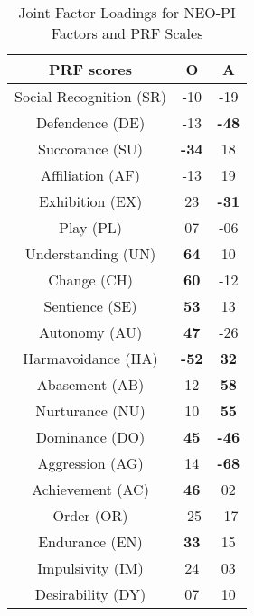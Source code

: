 \begin{table} [h]
\caption{Joint Factor Loadings for NEO-PI Factors and PRF Scales}
\centering
\begin{tabular}{c c c} 
\\
 \hline \hline
PRF	scores				& \textbf{O} 	&\textbf{A}	\\ [0.5ex] 
 \hline
 Social Recognition (SR)		& -10 		& -19		\\ 
 Defendence (DE)			& -13		& \textbf{-48}	\\
 Succorance (SU)			& \textbf{-34}	& 18			\\
 Affiliation (AF)				& -13  		& 19			\\
 Exhibition (EX)				& 23			& \textbf{-31}	\\
 Play (PL)					& 07			& -06		\\
 Understanding (UN)			& \textbf{64}	& 10			\\
 Change (CH)				& \textbf{60}	& -12		\\
 Sentience (SE)				& \textbf{53}	& 13			\\
 Autonomy (AU)			& \textbf{47}	& -26		\\
 Harmavoidance (HA)		& \textbf{-52}	& \textbf{32}	\\
 Abasement (AB)			& 12			& \textbf{58}	\\
 Nurturance (NU)			& 10			& \textbf{55}	\\
 Dominance (DO)			& \textbf{45}	& \textbf{-46}	\\
 Aggression (AG)			& 14			& \textbf{-68}	\\
 Achievement (AC)			& \textbf{46}	& 02			\\
 Order (OR)				& -25		& -17		\\
 Endurance (EN)			& \textbf{33}	& 15			\\
 Impulsivity (IM)				& 24			& 03			\\
 Desirability (DY)			& 07			& 10			\\ [1ex] 
 \hline \hline		
 \end{tabular}
 \label{table:2}
 \end{table}

